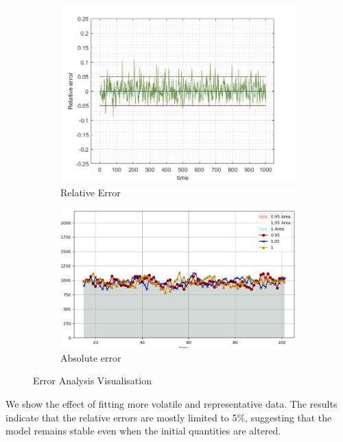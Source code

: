 \documentclass{mcmthesis}
\begin{document}
\begin{figure}[H]
  \centering
  \begin{subfigure}[b]{0.47\textwidth}
    \includegraphics[width=\textwidth]{figures/7_2_figur1.png}
    \caption{Relative Error}
    \label{fig:sub1}
  \end{subfigure}
  \hfill
  \begin{subfigure}[b]{0.49\textwidth}
    \includegraphics[width=\textwidth]{figures/7_2_figur2.png}
    \caption{Absolute error}
    \label{fig:sub2}
  \end{subfigure}

  \caption{Error Analysis Visualisation}
  \label{fig:Simulation of Disaster}
\end{figure}

We show the effect of fitting more volatile and representative data. The results indicate that the relative errors are mostly limited to 5\%, suggesting that the model remains stable even when the initial quantities are altered.
\end{document}
